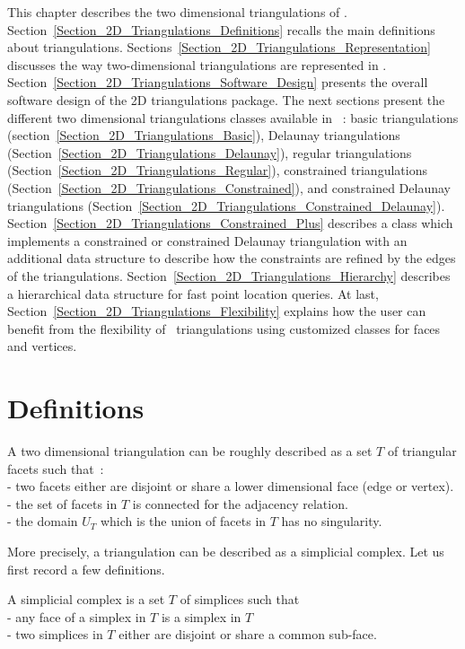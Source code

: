 This chapter describes the two dimensional triangulations
of \cgal. 
Section~\ref{Section_2D_Triangulations_Definitions} recalls the
main definitions about triangulations.
Sections~\ref{Section_2D_Triangulations_Representation} discusses
the way two-dimensional triangulations are represented in \cgal.
Section~\ref{Section_2D_Triangulations_Software_Design} presents
the overall software
design of the 2D triangulations package. 
The next sections present the different two dimensional triangulations classes
available in  \cgal~: 
basic triangulations (section~\ref{Section_2D_Triangulations_Basic}),
Delaunay triangulations
(Section~\ref{Section_2D_Triangulations_Delaunay}),
regular triangulations
(Section~\ref{Section_2D_Triangulations_Regular}),
constrained triangulations
(Section~\ref{Section_2D_Triangulations_Constrained}),
and constrained Delaunay triangulations
(Section~\ref{Section_2D_Triangulations_Constrained_Delaunay}).
Section~\ref{Section_2D_Triangulations_Constrained_Plus}
describes a class which implements a constrained or
constrained Delaunay triangulation  with
an additional data structure 
to describe how the constraints are refined 
by the edges of the triangulations.
Section~\ref{Section_2D_Triangulations_Hierarchy}
describes a hierarchical data structure for
fast point location queries.
At last, Section~\ref{Section_2D_Triangulations_Flexibility} 
explains how the user can  benefit  from the flexibility 
of  \cgal\ triangulations using customized classes for faces
and vertices.

\section{Definitions\label{Section_2D_Triangulations_Definitions}}

A two dimensional triangulation can be roughly described as a set $T$
of triangular facets such that~:\\
- two facets either are  disjoint or share a lower dimensional
face (edge or vertex).\\
- the set of facets in  $T$ is connected for the adjacency relation. \\
- the  domain $U_T$  which is the union
of facets in $T$ has no singularity.


More precisely, a triangulation can be described 
as a simplicial complex.
Let us first record a few definitions.

A simplicial complex is a set $T$  of simplices such that~\\
- any face of a simplex in $T$ is a simplex in $T$ \\
- two simplices in $T$  either are disjoint or  share
  a common sub-face.

